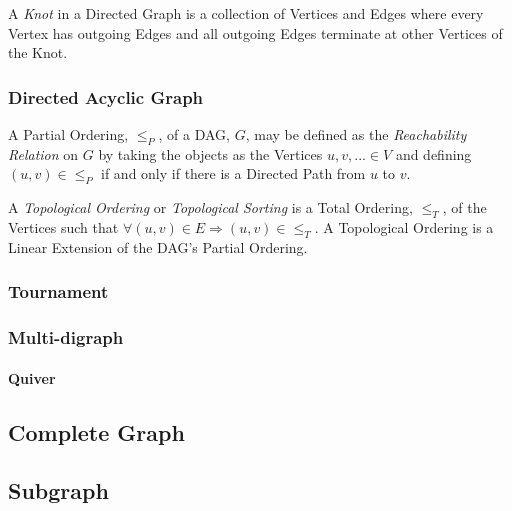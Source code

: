 A \emph{Knot} in a Directed Graph is a collection of Vertices and
Edges where every Vertex has outgoing Edges and all outgoing Edges
terminate at other Vertices of the Knot.



\subsubsection{Directed Acyclic Graph} \label{sec:dag}

A Partial Ordering, $\leq_P$, of a DAG, $G$, may be defined as the
\emph{Reachability Relation} on $G$ by taking the objects as the
Vertices $u,v,... \in V$ and defining $(u,v) \in \leq_P$ if and only
if there is a Directed Path from $u$ to $v$.

A \emph{Topological Ordering} or \emph{Topological Sorting} is a Total
Ordering, $\leq_T$, of the Vertices such that $\forall (u,v) \in E
\Rightarrow (u,v) \in \leq_T$. A Topological Ordering is a Linear
Extension of the DAG's Partial Ordering. %



\subsubsection{Tournament}\label{sec:tournament}



\subsubsection{Multi-digraph}\label{sec:multi-digraph}

\paragraph{Quiver}\label{sec:quiver}



\subsection{Complete Graph} \label{sec:complete_graph}

\subsection{Subgraph} \label{sec:subgraphs}


